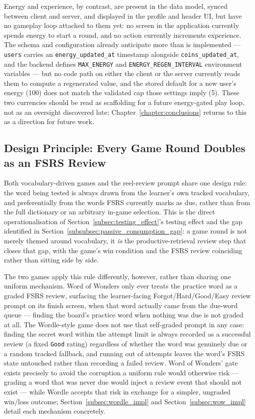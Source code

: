     Energy and experience, by contrast, are present in the data model, synced between client and server, and displayed in the profile and header UI, but have no gameplay loop attached to them yet: no screen in the application currently spends energy to start a round, and no action currently increments experience. The schema and configuration already anticipate more than is implemented --- \texttt{users} carries an \texttt{energy\_updated\_at} timestamp alongside \texttt{coins\_updated\_at}, and the backend defines \texttt{MAX\_ENERGY} and \texttt{ENERGY\_REGEN\_INTERVAL} environment variables --- but no code path on either the client or the server currently reads them to compute a regenerated value, and the stored default for a new user's energy (100) does not match the validated cap those settings imply (5). These two currencies should be read as scaffolding for a future energy-gated play loop, not as an oversight discovered late; Chapter~\ref{chapter:conclusions} returns to this as a direction for future work.

    \subsection{Design Principle: Every Game Round Doubles as an FSRS Review}
    \label{subsec:game_review_design}
    Both vocabulary-driven games and the reel-review prompt share one design rule: the word being tested is always drawn from the learner's own tracked vocabulary, and preferentially from the words FSRS currently marks as due, rather than from the full dictionary or an arbitrary in-game selection. This is the direct operationalisation of Section~\ref{subsec:testing_effect}'s testing effect and the gap identified in Section~\ref{subsubsec:passive_consumption_gap}: a game round is not merely themed around vocabulary, it \emph{is} the productive-retrieval review step that closes that gap, with the game's win condition and the FSRS review coinciding rather than sitting side by side.

    The two games apply this rule differently, however, rather than sharing one uniform mechanism. Word of Wonders only ever treats the practice word as a graded FSRS review, surfacing the learner-facing Forgot/Hard/Good/Easy review prompt on its finish screen, when that word actually came from the due-word queue --- finding the board's practice word when nothing was due is not graded at all. The Wordle-style game does not use that self-graded prompt in any case: finding the secret word within the attempt limit is always recorded as a successful review (a fixed \texttt{Good} rating) regardless of whether the word was genuinely due or a random tracked fallback, and running out of attempts leaves the word's FSRS state untouched rather than recording a failed review. Word of Wonders' gate exists precisely to avoid the corruption a uniform rule would otherwise risk --- grading a word that was never due would inject a review event that should not exist --- while Wordle accepts that risk in exchange for a simpler, ungraded win/loss outcome; Section~\ref{subsec:wordle_impl} and Section~\ref{subsec:wow_impl} detail each mechanism concretely.


